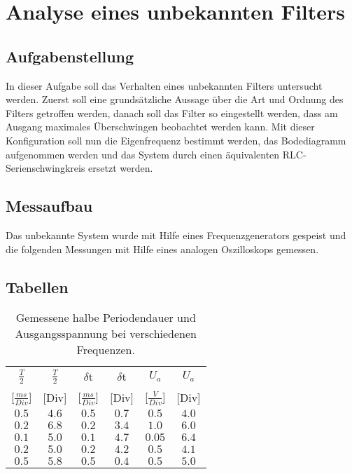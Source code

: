 \documentclass[12pt,a4paper,ngerman]{article}
\begin{document}


%
%

\section{Analyse eines unbekannten Filters}
\subsection{Aufgabenstellung}
In dieser Aufgabe soll das Verhalten eines unbekannten Filters untersucht werden. Zuerst soll eine grundsätzliche Aussage über die Art und Ordnung des Filters getroffen werden, danach soll das Filter so eingestellt werden, dass am Ausgang maximales Überschwingen beobachtet werden kann. 
Mit dieser Konfiguration soll nun die Eigenfrequenz bestimmt werden, das Bodediagramm aufgenommen werden und das System durch einen äquivalenten RLC-Serienschwingkreis ersetzt werden.

\subsection{Messaufbau}

Das unbekannte System wurde mit Hilfe eines Frequenzgenerators gespeist und die folgenden Messungen mit Hilfe eines analogen Oszilloskops gemessen. 

\subsection{Tabellen}
\begin{table}[H]
\begin{center}
\begin{tabular}{ |c|c||c|c||c|c| }
  \hline
    $\frac{T}{2}$ & $\frac{T}{2}$ & $\delta$t & $\delta$t & $U_a$ & $U_a$\\

    [$\frac{ms}{Div}$] & [Div] & [$\frac{ms}{Div}$] & [Div] & [$\frac{V}{Div}$] & [Div]\\
  \hline
$0.5$ & $4.6$ & $0.5$ & $0.7$ & $0.5$ & $4.0$ \\
  \hline
$0.2$ & $6.8$ & $0.2$ & $3.4$ & $1.0$ & $6.0$ \\
  \hline
$0.1$ & $5.0$ & $0.1$ & $4.7$ & $0.05$ & $6.4$ \\
  \hline
$0.2$ & $5.0$ & $0.2$ & $4.2$ & $0.5$ & $4.1$ \\
  \hline
$0.5$ & $5.8$ & $0.5$ & $0.4$ & $0.5$ & $5.0$ \\

  \hline
\end{tabular}
\caption{Gemessene halbe Periodendauer und Ausgangsspannung bei verschiedenen Frequenzen.}
\end{center}
\label{tab:1}
\end{table}
\end{document}
